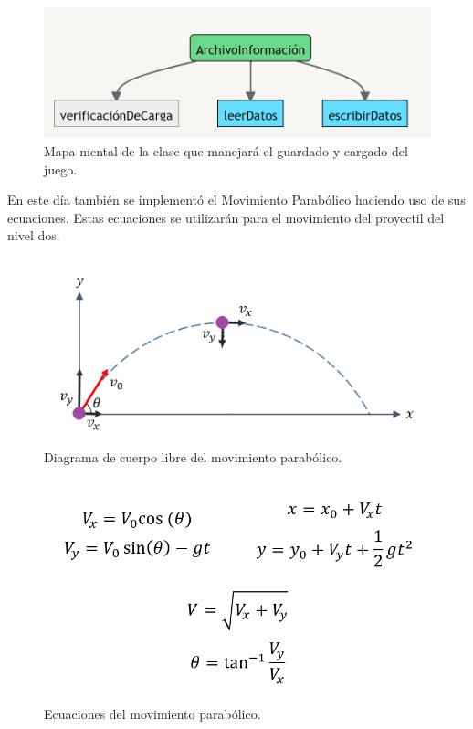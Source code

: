 \documentclass{article}
\begin{document}
\begin{figure}[h]
\includegraphics[scale=0.7]{Images/archivoinfo.png}
\centering
\caption{Mapa mental de la clase que manejará el guardado y cargado del juego.}
\label{fig:diagramaresorte}
\end{figure}

En este día también se implementó el Movimiento Parabólico haciendo uso de sus ecuaciones. Estas ecuaciones se utilizarán para el movimiento del proyectil del nivel dos.

\newpage
\begin{figure}[h]
\includegraphics[scale=1]{Images/diagramaparabolico.png}
\centering
\caption{Diagrama de cuerpo libre del movimiento parabólico.}
\label{fig:diagramaresorte}
\end{figure}

\begin{figure}[h]
\includegraphics[scale=0.7]{Images/ecuacionparabolica.png}
\centering
\caption{Ecuaciones del movimiento parabólico.}
\label{fig:ecuacionesmovpara}
\end{figure}
\end{document}
